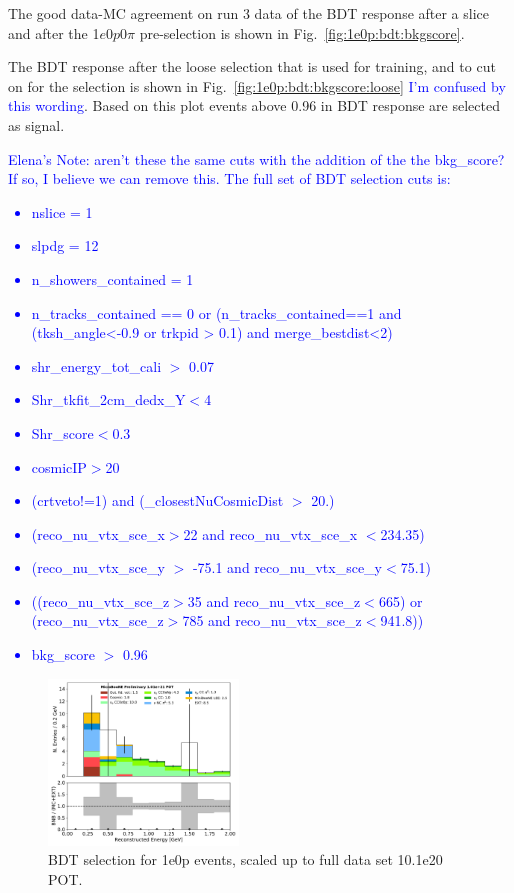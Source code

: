 \documentclass[a4paper]{article}
\newcommand{\zpsel}{1$e$0$p$0$\pi$ }
\begin{document}
The good data-MC agreement on run 3 data of the BDT response after a slice and after the \zpsel pre-selection is shown in Fig.~\ref{fig:1e0p:bdt:bkgscore}.  

The BDT response after the loose selection that is used for training, and to cut on for the selection is shown in Fig.~\ref{fig:1e0p:bdt:bkgscore:loose} \textcolor{blue}{I'm confused by this wording}.  Based on this plot events above 0.96 in BDT response are selected as signal.\\


\textcolor{blue}{Elena's Note: aren't these the same cuts with the addition of the the bkg\_score? If so, I believe we can remove this.
The full set of BDT selection cuts is:
\begin{itemize}
    \item nslice = 1
    \item slpdg = 12
    \item n\_showers\_contained = 1
    \item n\_tracks\_contained == 0 or (n\_tracks\_contained==1 and (tksh\_angle<-0.9 or trkpid > 0.1) and merge\_bestdist<2)
    \item shr\_energy\_tot\_cali $>$ 0.07
    \item Shr\_tkfit\_2cm\_dedx\_Y$<$4
    \item Shr\_score$<$0.3
    \item cosmicIP$>$20
    \item (crtveto!=1) and (\_closestNuCosmicDist $>$ 20.)
    \item (reco\_nu\_vtx\_sce\_x$>$22 and reco\_nu\_vtx\_sce\_x $<$234.35)
    \item (reco\_nu\_vtx\_sce\_y $>$ -75.1 and reco\_nu\_vtx\_sce\_y$<$75.1)
    \item ((reco\_nu\_vtx\_sce\_z$>$35 and reco\_nu\_vtx\_sce\_z$<$665) or (reco\_nu\_vtx\_sce\_z$>$785 and reco\_nu\_vtx\_sce\_z$<$941.8))
    \item bkg\_score $>$ 0.96
\end{itemize}
}

\begin{figure}[H]
\begin{center}
\includegraphics[width=0.45\textwidth]{1e0p/reco_e_01162020_RUN3_bgbdt.pdf}
\caption{\label{fig:1e0p:bdt:RUN3} BDT selection for 1e0p events, scaled up to full data set 10.1e20 POT.}
\end{center}
\end{figure}
\end{document}

